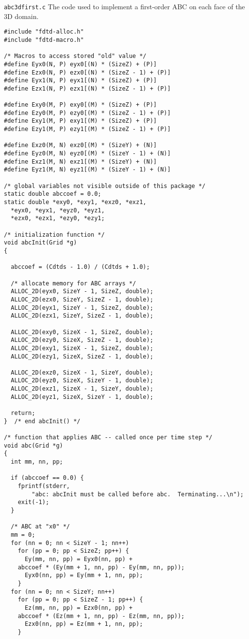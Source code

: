 \begin{program}
{\tt abc3dfirst.c} The code used to implement a first-order ABC on
each face of the 3D domain.
\label{pro:abc3dfirst}
\codemiddle
\begin{lstlisting}
#include "fdtd-alloc.h"
#include "fdtd-macro.h"

/* Macros to access stored "old" value */
#define Eyx0(N, P) eyx0[(N) * (SizeZ) + (P)]
#define Ezx0(N, P) ezx0[(N) * (SizeZ - 1) + (P)]
#define Eyx1(N, P) eyx1[(N) * (SizeZ) + (P)]
#define Ezx1(N, P) ezx1[(N) * (SizeZ - 1) + (P)]

#define Exy0(M, P) exy0[(M) * (SizeZ) + (P)]
#define Ezy0(M, P) ezy0[(M) * (SizeZ - 1) + (P)]
#define Exy1(M, P) exy1[(M) * (SizeZ) + (P)]
#define Ezy1(M, P) ezy1[(M) * (SizeZ - 1) + (P)]

#define Exz0(M, N) exz0[(M) * (SizeY) + (N)]
#define Eyz0(M, N) eyz0[(M) * (SizeY - 1) + (N)]
#define Exz1(M, N) exz1[(M) * (SizeY) + (N)]
#define Eyz1(M, N) eyz1[(M) * (SizeY - 1) + (N)]

/* global variables not visible outside of this package */
static double abccoef = 0.0;
static double *exy0, *exy1, *exz0, *exz1,
  *eyx0, *eyx1, *eyz0, *eyz1,
  *ezx0, *ezx1, *ezy0, *ezy1;

/* initialization function */
void abcInit(Grid *g)
{

  abccoef = (Cdtds - 1.0) / (Cdtds + 1.0);

  /* allocate memory for ABC arrays */
  ALLOC_2D(eyx0, SizeY - 1, SizeZ, double);
  ALLOC_2D(ezx0, SizeY, SizeZ - 1, double);
  ALLOC_2D(eyx1, SizeY - 1, SizeZ, double);
  ALLOC_2D(ezx1, SizeY, SizeZ - 1, double);

  ALLOC_2D(exy0, SizeX - 1, SizeZ, double);
  ALLOC_2D(ezy0, SizeX, SizeZ - 1, double);
  ALLOC_2D(exy1, SizeX - 1, SizeZ, double);
  ALLOC_2D(ezy1, SizeX, SizeZ - 1, double);

  ALLOC_2D(exz0, SizeX - 1, SizeY, double);
  ALLOC_2D(eyz0, SizeX, SizeY - 1, double);
  ALLOC_2D(exz1, SizeX - 1, SizeY, double);
  ALLOC_2D(eyz1, SizeX, SizeY - 1, double);

  return;
}  /* end abcInit() */

/* function that applies ABC -- called once per time step */
void abc(Grid *g)
{
  int mm, nn, pp;
  
  if (abccoef == 0.0) {
    fprintf(stderr,
	    "abc: abcInit must be called before abc.  Terminating...\n");
    exit(-1);
  }

  /* ABC at "x0" */
  mm = 0;
  for (nn = 0; nn < SizeY - 1; nn++)
    for (pp = 0; pp < SizeZ; pp++) {
      Ey(mm, nn, pp) = Eyx0(nn, pp) +
	abccoef * (Ey(mm + 1, nn, pp) - Ey(mm, nn, pp));
      Eyx0(nn, pp) = Ey(mm + 1, nn, pp);
    }
  for (nn = 0; nn < SizeY; nn++)
    for (pp = 0; pp < SizeZ - 1; pp++) {
      Ez(mm, nn, pp) = Ezx0(nn, pp) +
	abccoef * (Ez(mm + 1, nn, pp) - Ez(mm, nn, pp));
      Ezx0(nn, pp) = Ez(mm + 1, nn, pp);
    }
  

\end{lstlisting}
\end{program}
